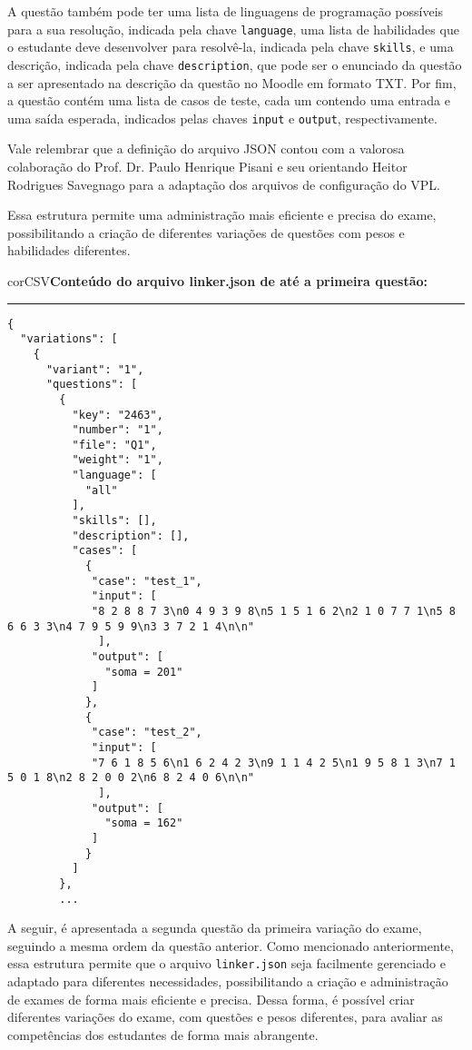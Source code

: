 A questão também pode ter uma lista de linguagens de programação possíveis para a sua resolução, indicada pela chave \verb|language|, uma lista de habilidades que o estudante deve desenvolver para resolvê-la, indicada pela chave \verb|skills|, e uma descrição, indicada pela chave \verb|description|, que pode ser o enunciado da questão a ser apresentado na descrição da questão no Moodle em formato TXT. Por fim, a questão contém uma lista de casos de teste, cada um contendo uma entrada e uma saída esperada, indicados pelas chaves \verb|input| e \verb|output|, respectivamente.

Vale relembrar que a definição do arquivo JSON contou com a valorosa colaboração do Prof. Dr. Paulo Henrique Pisani e seu orientando Heitor Rodrigues Savegnago para a
adaptação dos arquivos de configuração do VPL.

Essa estrutura permite uma administração mais eficiente e precisa do exame, possibilitando a criação de diferentes variações de questões com pesos e habilidades diferentes.


\begin{myboxCode}{corCSV}{\textbf{Conteúdo do arquivo linker.json de até a primeira questão:}}\vspace{3mm}
\hrule
{\scriptsize 
\begin{verbatim}
{
  "variations": [
    {
      "variant": "1",
      "questions": [
        {
          "key": "2463",
          "number": "1",
          "file": "Q1",
          "weight": "1",
          "language": [
            "all"
          ],
          "skills": [],
          "description": [],
          "cases": [
            {
             "case": "test_1",
             "input": [
             "8 2 8 8 7 3\n0 4 9 3 9 8\n5 1 5 1 6 2\n2 1 0 7 7 1\n5 8 6 6 3 3\n4 7 9 5 9 9\n3 3 7 2 1 4\n\n"
              ],
             "output": [
               "soma = 201"
             ]
            },
            {
             "case": "test_2",
             "input": [
             "7 6 1 8 5 6\n1 6 2 4 2 3\n9 1 1 4 2 5\n1 9 5 8 1 3\n7 1 5 0 1 8\n2 8 2 0 0 2\n6 8 2 4 0 6\n\n"
              ],
             "output": [
               "soma = 162"
             ]
            }
          ]
        },
        ...
\end{verbatim}
}
\end{myboxCode}

A seguir, é apresentada a segunda questão da primeira variação do exame, seguindo a mesma ordem da questão anterior. Como mencionado anteriormente, essa estrutura permite que o arquivo \verb|linker.json| seja facilmente gerenciado e adaptado para diferentes necessidades, possibilitando a criação e administração de exames de forma mais eficiente e precisa. Dessa forma, é possível criar diferentes variações do exame, com questões e pesos diferentes, para avaliar as competências dos estudantes de forma mais abrangente.


